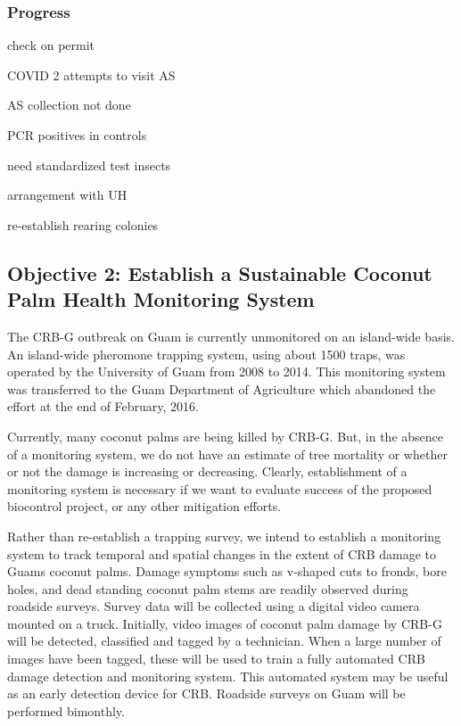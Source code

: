 \documentclass[12pt,letterpaper,english,bibliography=totocnumbered,abstract=on]{scrartcl}
\begin{document}
\subsubsection{Progress}

check on permit

COVID 2 attempts to visit AS

AS collection not done

PCR positives in controls

need standardized test insects

arrangement with UH

re-establish rearing colonies

\newpage\begin{framed}
\section{Objective 2: Establish a Sustainable Coconut Palm Health Monitoring System}

The CRB-G outbreak on Guam is currently unmonitored on an island-wide basis. An island-wide pheromone trapping system, using about 1500 traps, was operated by the University of Guam from 2008 to 2014. This monitoring system was transferred to the Guam Department of Agriculture which abandoned the effort at the end of February, 2016.

Currently, many coconut palms are being killed by CRB-G. But, in the absence of a monitoring system, we do not have an estimate of tree mortality or whether or not the damage is increasing or decreasing. Clearly, establishment of a monitoring system is necessary if we want to evaluate success of the proposed biocontrol project, or any other mitigation efforts.

Rather than re-establish a trapping survey, we intend to establish a monitoring system to track temporal and spatial changes in the extent of CRB damage to Guams coconut palms. Damage symptoms such as v-shaped cuts to fronds, bore holes, and dead standing coconut palm stems are readily observed during roadside surveys. Survey data will be collected using a digital video camera mounted on a truck. Initially, video images of coconut palm damage by CRB-G will be detected, classified and tagged by a technician. When a large number of images have been tagged, these will be used to train a fully automated CRB damage detection and monitoring system. This automated system may be useful as an early detection device for CRB. Roadside surveys on Guam will be performed bimonthly.


\end{framed}
\end{document}

